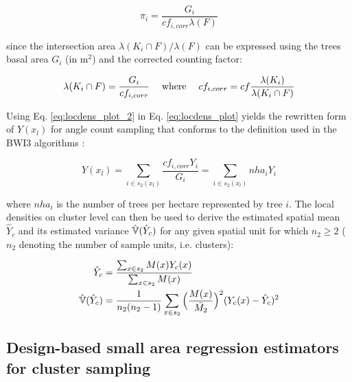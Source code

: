 \begin{equation}\label{eq:locdens_plot_2}
\pi_{i} = \frac{G_i}{cf_{i,corr}\lambda(F)}
	\end{equation}

since the intersection area $\lambda(K_i \cap F)/\lambda(F)$ can be expressed using the trees basal area $G_i$ (in m$^2$) and the corrected counting factor:

\begin{equation}\label{eq:locdens_plot_3}
\lambda(K_i \cap F) = \frac{G_i}{cf_{i, corr}} \hspace{3ex} \text{where} \hspace{3ex} cf_{i,corr} = cf\frac{\lambda(K_i)}{\lambda(K_i \cap F)}
\end{equation}

Using Eq. \ref{eq:locdens_plot_2} in Eq. \ref{eq:locdens_plot} yields the rewritten form of $Y(x_l)$ for angle count sampling that conforms to the definition used in the BWI3 algorithms \citep{bwi3_ausw}:

\begin{equation}\label{eq:locdens_plot_4}
Y(x_l)= \sum_{i \in s_{2}(x_l)} \frac{cf_{i, corr}Y_i}{G_i} = \sum_{i \in s_{2}(x_l)} nha_{i}{Y_i}
\end{equation}

where $nha_i$ is the number of trees per hectare represented by tree $i$. The local densities on cluster level can then be used to derive the estimated spatial mean $\hat{Y}_c$ and its estimated variance $\hat{\mathbb{V}}(\hat{Y}_c)$ for any given spatial unit for which $n_2 \geq 2$ ($n_2$ denoting the number of sample units, i.e. clusters):

\begin{subequations}\label{eq:srs_est_cluster}
	\begin{align}
\hat{Y}_c &= \frac{\sum_{x \in s_2} M(x) Y_{c}(x)}{\sum_{x \in s_2} M(x)} \\
\hat{\mathbb{V}}(\hat{Y}_c) &= \frac{1}{n_2(n_2 - 1)}\sum_{x \in s_2}\Big(\frac{M(x)}{\bar{M_2}}\Big)^2(Y_{c}(x) - \hat{Y}_c)^2
	\end{align}
\end{subequations}

\newpage

\subsection{Design-based small area regression estimators for cluster sampling}
\label{sec:SAestimators}

